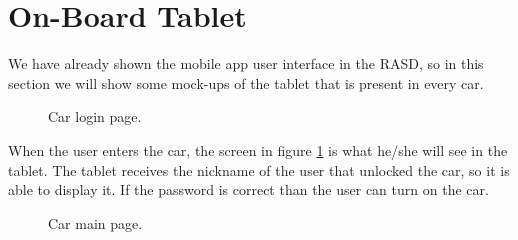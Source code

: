 \section{On-Board Tablet}
We have already shown the mobile app user interface in the RASD, so in this section we will show some mock-ups of the tablet that is present in every car.

\begin{figure}
    \vspace*{-2cm}
    \caption{Car login page.}
	\label{fig:car_login}
\end{figure}

When the user enters the car, the screen in figure \ref{fig:car_login} is what he/she will see in the tablet. The tablet receives the nickname of the user that unlocked the car, so it is able to display it. If the password is correct than the user can turn on the car.

\begin{figure}
    \vspace*{-2cm}
    \caption{Car main page.}
	\label{fig:car_main}
\end{figure}

